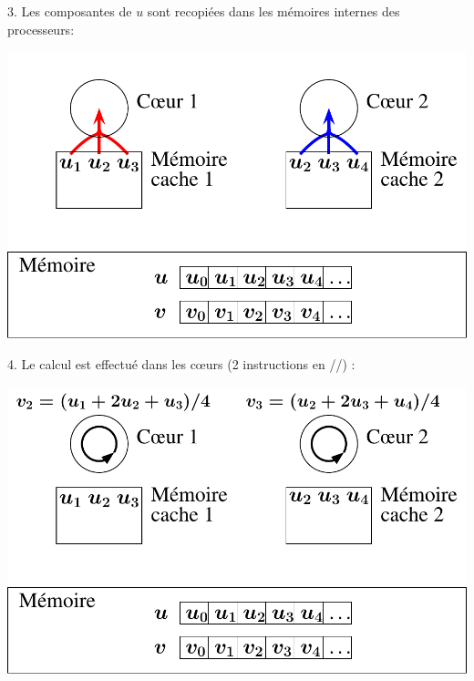 \documentclass{beamer}
\begin{document}
\begin{frame}
	\parbox[t][1cm]{10cm}{3. Les composantes de $u$ sont recopiées dans les mémoires internes des processeurs:}
   \begin{center}
	\includegraphics[scale=0.6]{../../Images/multithread2}
   \end{center}
\end{frame}

\begin{frame}
	\parbox[t][1cm]{10cm}{4. Le calcul est effectué dans les c\oe urs (2 instructions en //) :
	}
   \begin{center}
	\includegraphics[scale=0.6]{../../Images/multithread3}
   \end{center}
\end{frame}
\end{document}
